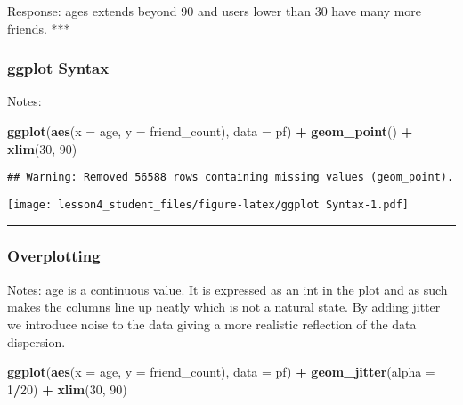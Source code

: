\documentclass[]{article}
\newenvironment{Shaded}{\begin{snugshade}}{\end{snugshade}}
\newcommand{\KeywordTok}[1]{\textcolor[rgb]{0.13,0.29,0.53}{\textbf{#1}}}
\newcommand{\DataTypeTok}[1]{\textcolor[rgb]{0.13,0.29,0.53}{#1}}
\newcommand{\DecValTok}[1]{\textcolor[rgb]{0.00,0.00,0.81}{#1}}
\newcommand{\StringTok}[1]{\textcolor[rgb]{0.31,0.60,0.02}{#1}}
\newcommand{\OperatorTok}[1]{\textcolor[rgb]{0.81,0.36,0.00}{\textbf{#1}}}
\newcommand{\NormalTok}[1]{#1}
\begin{document}
Response: ages extends beyond 90 and users lower than 30 have many more
friends. ***

\subsubsection{ggplot Syntax}\label{ggplot-syntax}

Notes:

\begin{Shaded}
\begin{Highlighting}[]
\KeywordTok{ggplot}\NormalTok{(}\KeywordTok{aes}\NormalTok{(}\DataTypeTok{x =}\NormalTok{ age, }\DataTypeTok{y =}\NormalTok{ friend_count), }\DataTypeTok{data =}\NormalTok{ pf) }\OperatorTok{+}
\StringTok{  }\KeywordTok{geom_point}\NormalTok{() }\OperatorTok{+}\StringTok{ }\KeywordTok{xlim}\NormalTok{(}\DecValTok{30}\NormalTok{, }\DecValTok{90}\NormalTok{)}
\end{Highlighting}
\end{Shaded}

\begin{verbatim}
## Warning: Removed 56588 rows containing missing values (geom_point).
\end{verbatim}

\texttt{[image: lesson4\_student\_files/figure-latex/ggplot Syntax-1.pdf]}

\begin{center}\rule{0.5\linewidth}{\linethickness}\end{center}

\subsubsection{Overplotting}\label{overplotting}

Notes: age is a continuous value. It is expressed as an int in the plot
and as such makes the columns line up neatly which is not a natural
state. By adding jitter we introduce noise to the data giving a more
realistic reflection of the data dispersion.

\begin{Shaded}
\begin{Highlighting}[]
\KeywordTok{ggplot}\NormalTok{(}\KeywordTok{aes}\NormalTok{(}\DataTypeTok{x =}\NormalTok{ age, }\DataTypeTok{y =}\NormalTok{ friend_count), }\DataTypeTok{data =}\NormalTok{ pf) }\OperatorTok{+}
\StringTok{  }\KeywordTok{geom_jitter}\NormalTok{(}\DataTypeTok{alpha =} \DecValTok{1}\OperatorTok{/}\DecValTok{20}\NormalTok{) }\OperatorTok{+}\StringTok{ }
\StringTok{  }\KeywordTok{xlim}\NormalTok{(}\DecValTok{30}\NormalTok{, }\DecValTok{90}\NormalTok{) }
\end{Highlighting}
\end{Shaded}
\end{document}
